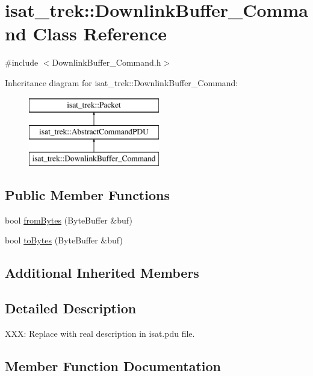 \hypertarget{classisat__trek_1_1_downlink_buffer___command}{}\section{isat\+\_\+trek\+:\+:Downlink\+Buffer\+\_\+\+Command Class Reference}
\label{classisat__trek_1_1_downlink_buffer___command}


{\ttfamily \#include $<$Downlink\+Buffer\+\_\+\+Command.\+h$>$}

Inheritance diagram for isat\+\_\+trek\+:\+:Downlink\+Buffer\+\_\+\+Command\+:\begin{figure}[H]
\begin{center}
\leavevmode
\includegraphics[height=3.000000cm]{classisat__trek_1_1_downlink_buffer___command}
\end{center}
\end{figure}
\subsection*{Public Member Functions}
\begin{DoxyCompactItemize}
\item 
bool \hyperlink{classisat__trek_1_1_downlink_buffer___command_a5cfd8df9c46fac235fcd9b50f4c5053b}{from\+Bytes} (Byte\+Buffer \&buf)
\item 
bool \hyperlink{classisat__trek_1_1_downlink_buffer___command_ae4b93f851e4424c43ba4b51c3cf32e40}{to\+Bytes} (Byte\+Buffer \&buf)
\end{DoxyCompactItemize}
\subsection*{Additional Inherited Members}


\subsection{Detailed Description}
X\+XX\+: Replace with real description in isat.\+pdu file. 

\subsection{Member Function Documentation}
